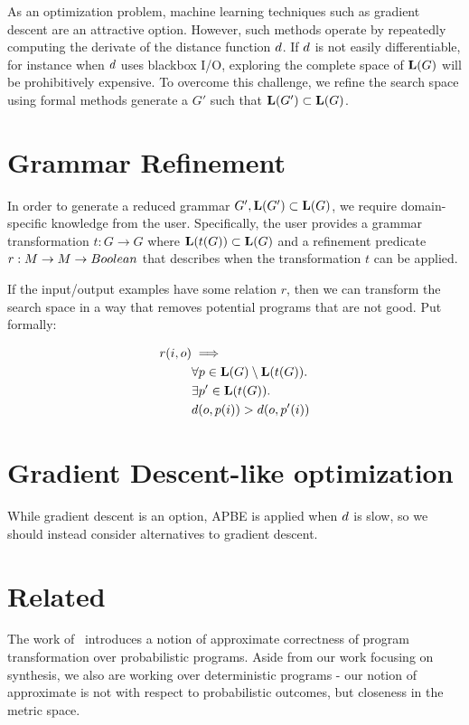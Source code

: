 As an optimization problem, machine learning techniques such as gradient descent are an attractive option.
However, such methods operate by repeatedly computing the derivate of the distance function ${d}$.
If ${d}$ is not easily differentiable, for instance when ${d}$ uses blackbox I/O, exploring the complete space of $\mathbf{L}(G)$ will be prohibitively expensive.
To overcome this challenge, we refine the search space using formal methods generate a $G'$ such that $\mathbf{L}(G') \subset \mathbf{L}(G)$.

\section{Grammar Refinement}
In order to generate a reduced grammar $G', \mathbf{L}(G') \subset \mathbf{L}(G)$, we require domain-specific knowledge from the user.
Specifically, the user provides a grammar transformation $t:G \to G$ where $\mathbf{L}(t(G)) \subset \mathbf{L}(G)$ 
  and a refinement predicate $r: M \to M \to Boolean$ that describes when the transformation $t$ can be applied. 

If the input/output examples have some relation $r$, then we can transform the search space in a way that removes potential programs that are not good.
Put formally:

\begin{align*}
   r(i,o) &\implies \\
   & \forall p \in \mathbf{L}(G) \setminus \mathbf{L}(t(G)). \\
   & \exists p' \in \mathbf{L}(t(G)). \\
   & {d}(o,p(i)) > {d}(o,p'(i)) 
\end{align*}


\section{Gradient Descent-like optimization}

While gradient descent is an option, APBE is applied when ${d}$ is slow, so we should instead consider alternatives to gradient descent.


\section{Related}

The work of~\cite{misailovic2011probabilistically} introduces a notion of approximate correctness of program transformation over probabilistic programs.
Aside from our work focusing on synthesis, we also are working over deterministic programs - our notion of approximate is not with respect to probabilistic outcomes, but closeness in the metric space.

